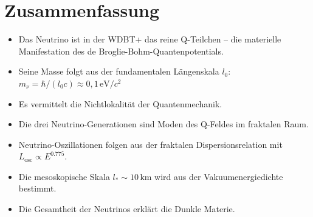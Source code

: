 \section{Zusammenfassung}
\label{app:neutrino_oszillation_zusammenfassung}

\begin{itemize}
    \item Das Neutrino ist in der WDBT+ das reine Q-Teilchen – die materielle 
          Manifestation des de Broglie-Bohm-Quantenpotentials.
    \item Seine Masse folgt aus der fundamentalen Längenskala $l_0$:
          $m_{\nu} = \hbar/(l_0 c) \approx 0,1\,\text{eV}/c^2$
    \item Es vermittelt die Nichtlokalität der Quantenmechanik.
    \item Die drei Neutrino-Generationen sind Moden des Q-Feldes im fraktalen Raum.
    \item Neutrino-Oszillationen folgen aus der fraktalen Dispersionsrelation mit 
          $L_{\text{osc}} \propto E^{0.775}$.
    \item Die mesoskopische Skala $l_* \sim 10\,\text{km}$ wird aus der Vakuumenergiedichte 
          bestimmt.
    \item Die Gesamtheit der Neutrinos erklärt die Dunkle Materie.
\end{itemize}